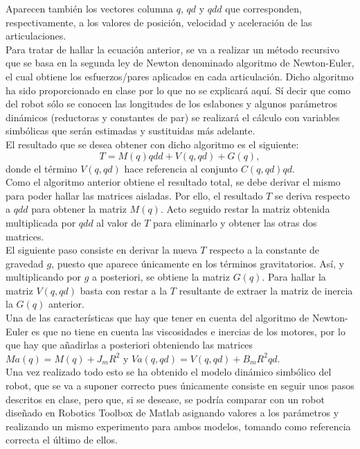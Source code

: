 Aparecen también los vectores columna $q$, $qd$ y $qdd$ que corresponden, respectivamente, a los valores de posición, velocidad y aceleración de las articulaciones.\\

Para tratar de hallar la ecuación anterior, se va a realizar un método recursivo que se basa en la segunda ley de Newton denominado algoritmo de Newton-Euler, el cual obtiene los esfuerzos/pares aplicados en cada articulación. Dicho algoritmo ha sido proporcionado en clase por lo que no se explicará aquí. Sí decir que como del robot sólo se conocen las longitudes de los eslabones y algunos parámetros dinámicos (reductoras y constantes de par) se realizará el cálculo con variables simbólicas que serán estimadas y sustituidas más adelante.\\

El resultado que se desea obtener con dicho algoritmo es el siguiente:\\
\begin{equation}
T=M(q)qdd+V(q,qd)+G(q),
\end{equation}
donde el término $V(q,qd)$ hace referencia al conjunto $C(q,qd)qd$.\\

Como el algoritmo anterior obtiene el resultado total, se debe derivar el mismo para poder hallar las matrices aisladas. Por ello, el resultado $T$ se deriva respecto a $qdd$ para obtener la matriz $M(q)$. Acto seguido restar la matriz obtenida multiplicada por $qdd$ al valor de $T$ para eliminarlo y obtener las otras dos matrices.\\

El siguiente paso consiste en derivar la nueva $T$ respecto a la constante de gravedad $g$, puesto que aparece únicamente en los términos gravitatorios. Así, y multiplicando por $g$ a posteriori, se obtiene la matriz $G(q)$. Para hallar la matriz $V(q,qd)$ basta con restar a la $T$ resultante de extraer la matriz de inercia la $G(q)$ anterior.\\

Una de las características que hay que tener en cuenta del algoritmo de Newton-Euler es que no tiene en cuenta las viscosidades e inercias de los motores, por lo que hay que añadirlas a posteriori obteniendo las matrices $Ma(q)=M(q)+J_mR^2$ y $Va(q,qd)=V(q,qd)+B_mR^2qd$.\\

Una vez realizado todo esto se ha obtenido el modelo dinámico simbólico del robot, que se va a suponer correcto pues únicamente consiste en seguir unos pasos descritos en clase, pero que, si se desease, se podría comparar con un robot diseñado en Robotics Toolbox de Matlab asignando valores a los parámetros y realizando un mismo experimento para ambos modelos, tomando como referencia correcta el último de ellos.\\




	
